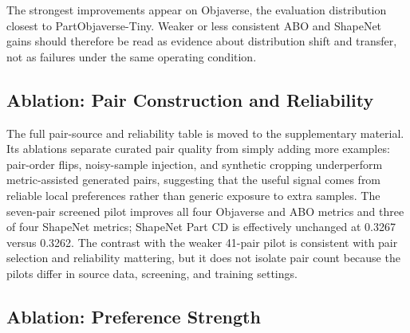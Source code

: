 \documentclass[10pt,twocolumn,letterpaper]{article}
\begin{document}
The strongest improvements appear on Objaverse, the evaluation distribution closest to PartObjaverse-Tiny. Weaker or less consistent ABO and ShapeNet gains should therefore be read as evidence about distribution shift and transfer, not as failures under the same operating condition.

\subsection{Ablation: Pair Construction and Reliability}
\label{sec:ablation_reliability}

The full pair-source and reliability table is moved to the supplementary material. Its ablations separate curated pair quality from simply adding more examples: pair-order flips, noisy-sample injection, and synthetic cropping underperform metric-assisted generated pairs, suggesting that the useful signal comes from reliable local preferences rather than generic exposure to extra samples. The seven-pair screened pilot improves all four Objaverse and ABO metrics and three of four ShapeNet metrics; ShapeNet Part CD is effectively unchanged at 0.3267 versus 0.3262. The contrast with the weaker 41-pair pilot is consistent with pair selection and reliability mattering, but it does not isolate pair count because the pilots differ in source data, screening, and training settings.

\subsection{Ablation: Preference Strength}
\label{sec:ablation_strength}
\end{document}
